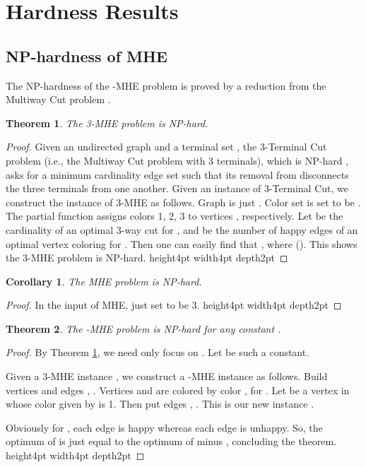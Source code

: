 \documentclass[11pt]{article}
\newtheorem{theorem}{Theorem}[section]
\newtheorem{corollary}{Corollary}[section]
\newcommand{\qed}{\vrule height4pt width4pt depth2pt}
\begin{document}
\section{Hardness Results}
\label{sec - Hardness results}




\subsection{NP-hardness of MHE}
\label{subsec - NP-hardness of MHE}
The NP-hardness of the -MHE problem is proved by a reduction from
the Multiway Cut problem \cite{DJP+94}.

\begin{theorem}
\label{th - 3-MHE is NP-hard}
The 3-MHE problem is NP-hard.
\end{theorem}
\begin{proof}
Given an undirected graph  and a terminal set ,
the 3-Terminal Cut problem (i.e., the Multiway Cut problem with
3 terminals), which is NP-hard \cite{DJP+94}, asks for a minimum cardinality
edge set such that its removal from  disconnects the three terminals
from one another. Given an instance  of 3-Terminal Cut, we construct
the instance  of 3-MHE as follows.
Graph  is just . Color set  is set to be .
The partial function  assigns colors 1, 2, 3 to vertices ,
respectively. Let  be the cardinality of an optimal 3-way cut for
, and  be the number of happy edges of an optimal vertex
coloring for . Then one can easily find that ,
where  (). This shows the 3-MHE problem is NP-hard.
\qed
\end{proof}

\begin{corollary}
The MHE problem is NP-hard.
\end{corollary}
\begin{proof}
In the input of MHE, just set  to be 3. \qed
\end{proof}



\begin{theorem}
\label{th - k-MHE is NP-hard}
The -MHE problem is NP-hard for any constant .
\end{theorem}
\begin{proof}
By Theorem \ref{th - 3-MHE is NP-hard}, we need only focus on .
Let  be such a constant.

Given a 3-MHE instance , we construct a -MHE instance 
as follows. Build  vertices 
and  edges , .
Vertices  and  are colored by color , for .
Let  be a vertex in  whose color given by  is 1.
Then put  edges , .
This is our new instance .

Obviously for , each edge  is happy
whereas each edge  is unhappy.
So, the optimum of  is just equal to the optimum of 
minus , concluding the theorem.
\qed
\end{proof}
\end{document}
